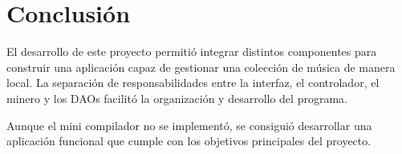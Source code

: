 \documentclass[12pt]{article}  %
\begin{document}
\section{Conclusión}

El desarrollo de este proyecto permitió integrar distintos componentes para
construir una aplicación capaz de gestionar una colección de música de manera
local. La separación de responsabilidades entre la interfaz, el controlador, el
minero y los DAOs facilitó la organización y desarrollo del programa.

Aunque el mini compilador no se implementó, se consiguió desarrollar una
aplicación funcional que cumple con los objetivos principales del proyecto.

\end{document}
